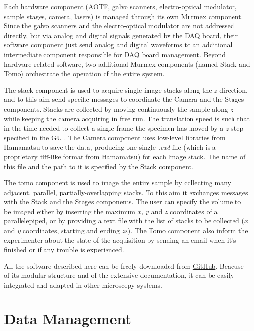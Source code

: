 \documentclass[12pt]{spieman}  %
\begin{document}
Each hardware component (AOTF, galvo scanners, electro-optical modulator, sample stages, camera, lasers) is managed through its own Murmex component. Since the galvo scanners and the electro-optical modulator are not addressed directly, but via analog and digital signals generated by the DAQ board, their software component just send analog and digital waveforms to an additional intermediate component responsible for DAQ board management. Beyond hardware-related software, two additional Murmex components (named Stack and Tomo) orchestrate the operation of the entire system. 

The stack component is used to acquire single image stacks along the $z$ direction, and to this aim send specific messages to coordinate the Camera and the Stages components. Stacks are collected by moving continuously the sample along $z$ while keeping the camera acquiring in free run. The translation speed is such that in the time needed to collect a single frame the specimen has moved by a $z$ step specified in the GUI. The Camera component uses low-level libraries from Hamamatsu to save the data, producing one single \emph{.cxd} file (which is a proprietary tiff-like format from Hamamatsu) for each image stack. The name of this file and the path to it is specified by the Stack component.

The tomo component is used to image the entire sample by collecting many adjacent, parallel, partially-overlapping stacks. To this aim it exchanges messages with the Stack and the Stages components. The user can specify the volume to be imaged either by inserting the maximum $x$, $y$ and $z$ coordinates of a parallelepiped, or by providing a text file with the list of stacks to be collected ($x$ and $y$ coordinates, starting and ending $z$s). The Tomo component also inform the experimenter about the state of the acquisition by sending an email when it's finished or if any trouble is experienced.

All the software described here can be freely downloaded from \href{https://github.com/marcelvanthoff/Giorgio}{GitHub}. Beacuse of its modular structure and of the extensive documentation, it can be easily integrated and adapted in other microscopy systems.

\section{Data Management}
\end{document}
